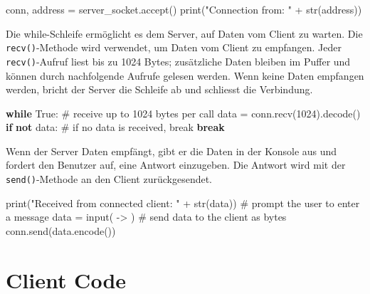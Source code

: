 \documentclass[
  nswissgerman,
  a4paper,
  DIV=11,
  numbers=noendperiod,
  ngerman]{scrreprt}
\newenvironment{Shaded}{\begin{snugshade}}{\end{snugshade}}
\newcommand{\BuiltInTok}[1]{\textcolor[rgb]{0.00,0.23,0.31}{#1}}
\newcommand{\CommentTok}[1]{\textcolor[rgb]{0.37,0.37,0.37}{#1}}
\newcommand{\ControlFlowTok}[1]{\textcolor[rgb]{0.00,0.23,0.31}{\textbf{#1}}}
\newcommand{\DecValTok}[1]{\textcolor[rgb]{0.68,0.00,0.00}{#1}}
\newcommand{\KeywordTok}[1]{\textcolor[rgb]{0.00,0.23,0.31}{\textbf{#1}}}
\newcommand{\NormalTok}[1]{\textcolor[rgb]{0.00,0.23,0.31}{#1}}
\newcommand{\OperatorTok}[1]{\textcolor[rgb]{0.37,0.37,0.37}{#1}}
\newcommand{\StringTok}[1]{\textcolor[rgb]{0.13,0.47,0.30}{#1}}
\newcommand{\VariableTok}[1]{\textcolor[rgb]{0.07,0.07,0.07}{#1}}
\begin{document}
\begin{Shaded}
\begin{Highlighting}[numbers=left,,]
\NormalTok{conn, address }\OperatorTok{=}\NormalTok{ server\_socket.accept()}
\BuiltInTok{print}\NormalTok{(}\StringTok{"Connection from: "} \OperatorTok{+} \BuiltInTok{str}\NormalTok{(address))}
\end{Highlighting}
\end{Shaded}

Die while-Schleife ermöglicht es dem Server, auf Daten vom Client zu
warten. Die \texttt{recv()}-Methode wird verwendet, um Daten vom Client
zu empfangen. Jeder \texttt{recv()}-Aufruf liest bis zu 1024 Bytes;
zusätzliche Daten bleiben im Puffer und können durch nachfolgende
Aufrufe gelesen werden. Wenn keine Daten empfangen werden, bricht der
Server die Schleife ab und schliesst die Verbindung.

\begin{Shaded}
\begin{Highlighting}[numbers=left,,]
\ControlFlowTok{while} \VariableTok{True}\NormalTok{:}
        \CommentTok{\# receive up to 1024 bytes per call}
\NormalTok{        data }\OperatorTok{=}\NormalTok{ conn.recv(}\DecValTok{1024}\NormalTok{).decode()}
        \ControlFlowTok{if} \KeywordTok{not}\NormalTok{ data:}
            \CommentTok{\# if no data is received, break}
            \ControlFlowTok{break}
        
\end{Highlighting}
\end{Shaded}

Wenn der Server Daten empfängt, gibt er die Daten in der Konsole aus und
fordert den Benutzer auf, eine Antwort einzugeben. Die Antwort wird mit
der \texttt{send()}-Methode an den Client zurückgesendet.

\begin{Shaded}
\begin{Highlighting}[numbers=left,,]
\BuiltInTok{print}\NormalTok{(}\StringTok{"Received from connected client: "} \OperatorTok{+} \BuiltInTok{str}\NormalTok{(data))}
        \CommentTok{\# prompt the user to enter a message}
\NormalTok{        data }\OperatorTok{=} \BuiltInTok{input}\NormalTok{(}\StringTok{\textquotesingle{} {-}\textgreater{} \textquotesingle{}}\NormalTok{)}
        \CommentTok{\# send data to the client as bytes}
\NormalTok{        conn.send(data.encode())}
\end{Highlighting}
\end{Shaded}

\section{Client Code}\label{client-code}
\end{document}

